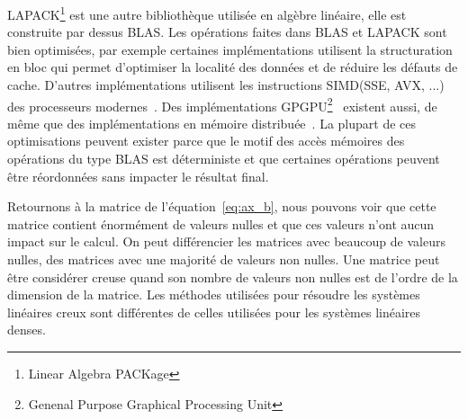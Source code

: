 LAPACK\footnote{Linear Algebra PACKage} est une autre bibliothèque utilisée en algèbre linéaire, elle est construite par dessus BLAS.
%
Les opérations faites dans BLAS et LAPACK sont bien optimisées, par exemple certaines implémentations utilisent la structuration en bloc qui permet d'optimiser la localité des données et de réduire les défauts de cache.
%
D'autres implémentations utilisent les instructions SIMD(SSE, AVX, ...) des processeurs modernes~\cite{intel_mkl}.
%
Des implémentations GPGPU\footnote{Genenal Purpose Graphical Processing Unit}~\cite{nvidia_cublas} existent aussi, de même que des implémentations en mémoire distribuée~\cite{dplasma}.
%
La plupart de ces optimisations peuvent exister parce que le motif des accès mémoires des opérations du type BLAS est déterministe et que certaines opérations peuvent être réordonnées sans impacter le résultat final.


Retournons à la matrice de l'équation~\eqref{eq:ax_b}, nous pouvons voir que cette matrice contient énormément de valeurs nulles et que ces valeurs n'ont aucun impact sur le calcul.
%
On peut différencier les matrices avec beaucoup de valeurs nulles, des matrices avec une majorité de valeurs non nulles.
%
Une matrice peut être considérer creuse quand son nombre de valeurs non nulles est de l'ordre de la dimension de la matrice.
%
Les méthodes utilisées pour résoudre les systèmes linéaires creux sont différentes de celles utilisées pour les systèmes linéaires denses.
